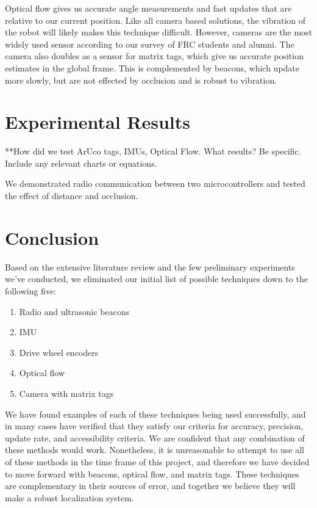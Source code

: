 \documentclass{article}
\begin{document}
Optical flow gives us accurate angle measurements and fast updates that are relative to our current position. Like all camera based solutions, the vibration of the robot will likely makes this technique difficult. However, cameras are the most widely used sensor according to our survey of FRC students and alumni.
The camera also doubles as a sensor for matrix tags, which give us accurate position estimates in the global frame. This is complemented by beacons, which update more slowly, but are not effected by occlusion and is robust to vibration.

\section{Experimental Results} \label{experiments}

**How did we test ArUco tags, IMUs, Optical Flow. What results? Be specific. Include any relevant charts or equations.

We demonstrated radio communication between two microcontrollers and tested the effect of distance and occlusion.

\section{Conclusion} \label{conclusion}

Based on the extensive literature review and the few preliminary experiments we've conducted, we eliminated our initial list of possible techniques down to the following five:
\begin{enumerate}
    \item Radio and ultrasonic beacons
    \item IMU
    \item Drive wheel encoders
    \item Optical flow
    \item Camera with matrix tags
\end{enumerate}

We have found examples of each of these techniques being used successfully, and in many cases have verified that they satisfy our criteria for accuracy, precision, update rate, and accessibility criteria. We are confident that any combination of these methods would work. Nonetheless, it is unreasonable to attempt to use all of these methods in the time frame of this project, and therefore we have decided to move forward with beacons, optical flow, and matrix tags. These techniques are complementary in their sources of error, and together we believe they will make a robust localization system.
\end{document}
